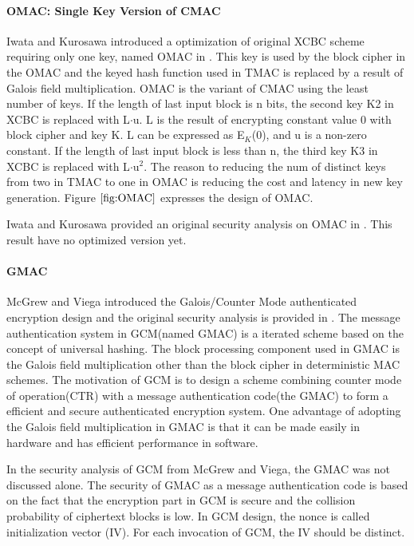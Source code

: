 \documentclass{article}
\begin{document}
\paragraph{OMAC: Single Key Version of CMAC}
Iwata and Kurosawa introduced a optimization of original XCBC scheme requiring only one key, named OMAC in \cite{omac}. This key is used by the block cipher in the OMAC and the keyed hash function used in TMAC is replaced by a result of Galois field multiplication. OMAC is the variant of CMAC using the least number of keys. 
If the length of last input block is n bits, the second key K2 in XCBC is replaced with L$\cdot$u. L is the result of encrypting constant value 0 with block cipher and key K. L can be expressed as E$_K$(0), and u is a non-zero constant. If the length of last input block is less than n, the third key K3 in XCBC is replaced with L$\cdot$u$^2$.  
The reason to reducing the num of distinct keys from two in TMAC to one in OMAC is reducing the cost and latency in new key generation. Figure $\ref{fig:OMAC}$ expresses the design of OMAC.

Iwata and Kurosawa provided an original security analysis on OMAC in \cite{omac}. This result have no optimized version yet.


\paragraph{GMAC}
McGrew and Viega introduced the Galois/Counter Mode authenticated encryption design and the original security analysis is provided in \cite{gcm}. The message authentication system in GCM(named GMAC) is a iterated scheme based on the concept of universal hashing. The block processing component used in GMAC is the Galois field multiplication other than the block cipher in deterministic MAC schemes. 
The motivation of GCM is to design a scheme combining counter mode of operation(CTR) with a message authentication code(the GMAC) to form a efficient and secure authenticated encryption system.
One advantage of adopting the Galois field multiplication in GMAC is that it can be made easily in hardware and has efficient performance in software. 

In the security analysis of GCM from McGrew and Viega, the GMAC was not discussed alone. The security of GMAC as a message authentication code is based on the fact that the encryption part in GCM is secure and the collision probability of ciphertext blocks is low. 
In GCM design, the nonce is called initialization vector (IV). For each invocation of GCM, the IV should be distinct.
\end{document}
